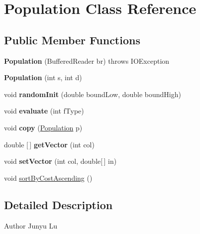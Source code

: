 \hypertarget{class_population}{}\section{Population Class Reference}
\label{class_population}
\subsection*{Public Member Functions}
\begin{DoxyCompactItemize}
\item 
\mbox{\label{class_population_a73588637ee8cdece58bf486818d821f0}} 
{\bfseries Population} (Buffered\+Reader br)  throws I\+O\+Exception 
\item 
\mbox{\label{class_population_af87590b1c0c8c1db7682d4c63f2f88a2}} 
{\bfseries Population} (int s, int d)
\item 
\mbox{\label{class_population_a4d63ad24a8a5c457c49c0611e29b6067}} 
void {\bfseries random\+Init} (double bound\+Low, double bound\+High)
\item 
\mbox{\label{class_population_a3194655e4e7729ca872c7d6b937e2c0e}} 
void {\bfseries evaluate} (int f\+Type)
\item 
\mbox{\label{class_population_ac14e6ca561012170df69fc20160498f1}} 
void {\bfseries copy} (\mbox{\hyperlink{class_population}{Population}} p)
\item 
\mbox{\label{class_population_acc7002d292ba51ad153f6f7f1d566408}} 
double \mbox{[}$\,$\mbox{]} {\bfseries get\+Vector} (int col)
\item 
\mbox{\label{class_population_a7ff5566210e9050e5540686bffb6e5b9}} 
void {\bfseries set\+Vector} (int col, double\mbox{[}$\,$\mbox{]} in)
\item 
void \mbox{\hyperlink{class_population_a5bde451618cde8c6b3ea08dc87846a53}{sort\+By\+Cost\+Ascending}} ()
\end{DoxyCompactItemize}


\subsection{Detailed Description}
\begin{DoxyAuthor}{Author}
Junyu Lu 
\end{DoxyAuthor}


